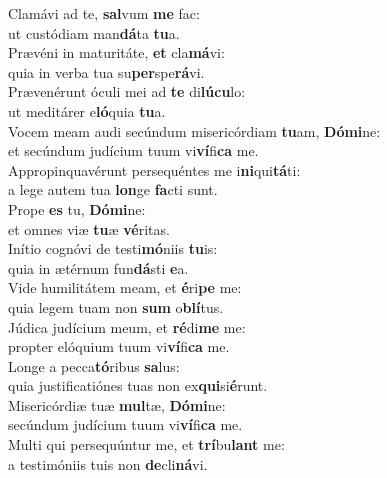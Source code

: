 \evenverse Clamávi ad te, \textbf{sal}vum \textbf{me} fac:~\*\\
\evenverse ut custódiam man\textbf{dá}ta \textbf{tu}a.\\
\oddverse Prævéni in maturitáte, \textbf{et} cla\textbf{má}vi:~\*\\
\oddverse quia in verba tua su\textbf{per}spe\textbf{rá}vi.\\
\evenverse Prævenérunt óculi mei ad \textbf{te} di\textbf{lú}\textbf{cu}lo:~\*\\
\evenverse ut meditárer e\textbf{ló}quia \textbf{tu}a.\\
\oddverse Vocem meam audi secúndum misericórdiam \textbf{tu}am, \textbf{Dó}\textbf{mi}ne:~\*\\
\oddverse et secúndum judícium tuum vi\textbf{ví}fi\textbf{ca} me.\\
\evenverse Appropinquavérunt persequéntes me i\textbf{ni}qui\textbf{tá}ti:~\*\\
\evenverse a lege autem tua \textbf{lon}ge \textbf{fa}cti sunt.\\
\oddverse Prope \textbf{es} tu, \textbf{Dó}\textbf{mi}ne:~\*\\
\oddverse et omnes viæ \textbf{tu}æ \textbf{vé}ritas.\\
\evenverse Inítio cognóvi de testi\textbf{mó}niis \textbf{tu}is:~\*\\
\evenverse quia in ætérnum fun\textbf{dá}sti \textbf{e}a.\\
\oddverse Vide humilitátem meam, et \textbf{é}ri\textbf{pe} me:~\*\\
\oddverse quia legem tuam non \textbf{sum} o\textbf{blí}tus.\\
\evenverse Júdica judícium meum, et \textbf{ré}di\textbf{me} me:~\*\\
\evenverse propter elóquium tuum vi\textbf{ví}fi\textbf{ca} me.\\
\oddverse Longe a pecca\textbf{tó}ribus \textbf{sa}lus:~\*\\
\oddverse quia justificatiónes tuas non ex\textbf{qui}si\textbf{é}runt.\\
\evenverse Misericórdiæ tuæ \textbf{mul}tæ, \textbf{Dó}\textbf{mi}ne:~\*\\
\evenverse secúndum judícium tuum vi\textbf{ví}fi\textbf{ca} me.\\
\oddverse Multi qui persequúntur me, et \textbf{trí}bu\textbf{lant} me:~\*\\
\oddverse a testimóniis tuis non \textbf{de}cli\textbf{ná}vi.\\
